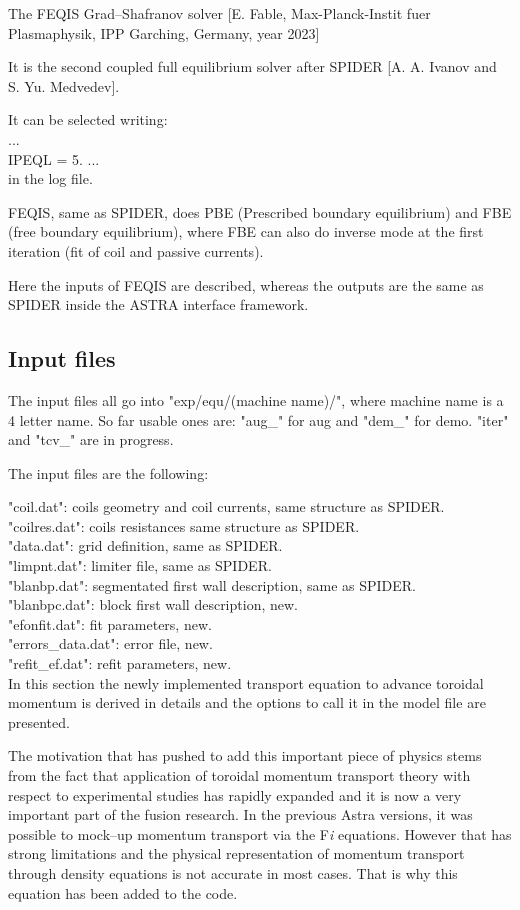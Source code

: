 The FEQIS Grad--Shafranov solver [E. Fable, Max-Planck-Instit fuer Plasmaphysik, IPP Garching, Germany, year 2023]

It is the second coupled full equilibrium solver after SPIDER [A. A. Ivanov and S. Yu. Medvedev].

It can be selected writing: \\
...\\
IPEQL  =  5.
...\\
in the log file.

FEQIS, same as SPIDER, does PBE (Prescribed boundary equilibrium) and FBE (free boundary equilibrium), where FBE can also do inverse mode at the first iteration (fit of coil and passive currents).

Here the inputs of FEQIS are described, whereas the outputs are the same as SPIDER inside the ASTRA interface framework.

\subsection{Input files}
The input files all go into "exp/equ/(machine name)/", where machine name is a 4 letter name.
So far usable ones are: "aug\_" for aug and "dem\_" for demo. "iter" and "tcv\_" are in progress.

The input files are the following: 

"coil.dat": coils geometry and coil currents, same structure as SPIDER.\\
"coilres.dat": coils resistances same structure as SPIDER.\\
"data.dat": grid definition, same as SPIDER.\\
"limpnt.dat": limiter file, same as SPIDER.\\
"blanbp.dat": segmentated first wall description, same as SPIDER.\\
"blanbpc.dat": block first wall description, new.\\
"efonfit.dat": fit parameters, new.\\
"errors_data.dat": error file, new. \\
"refit_ef.dat": refit parameters, new. \\


In this section the newly implemented transport equation to advance toroidal 
momentum is derived in details and the options to call it in the model file are
presented. 

The motivation that has pushed to add this important piece of physics stems from
the fact that application of toroidal momentum transport theory with respect to 
experimental studies has rapidly expanded and it is now a very important part of
the fusion research. In the previous Astra versions, it was possible to mock--up
momentum transport via the F{\it i} equations. However that has strong 
limitations and the physical representation of momentum transport through 
density equations is not accurate in most cases. That is why this equation has
been added to the code.

